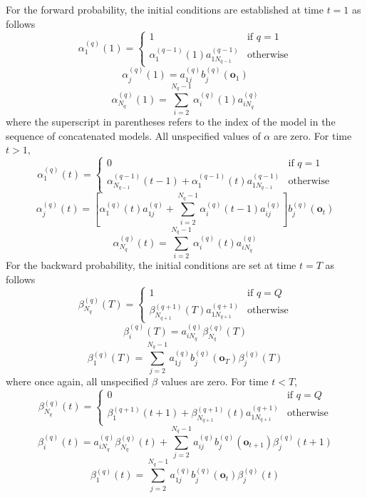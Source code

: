For the forward probability, the initial conditions are established at
time $t=1$ as follows
\[
   \alpha^{(q)}_{1}(1) = 
        \left\{ \begin{array}{cl}
                              1 & \mbox{if $q=1$} \\
                   \alpha^{(q-1)}_1(1)  a^{(q-1)}_{1N_{q-1}} & \mbox{otherwise}
                \end{array}
        \right.
\]
\[
   \alpha^{(q)}_{j}(1) = a^{(q)}_{1j} b^{(q)}_j(\bm{o}_1)
\]
\[
   \alpha^{(q)}_{N_q}(1) = 
        \sum_{i=2}^{N_q-1} \alpha^{(q)}_{i}(1) a^{(q)}_{iN_q}
\]
where the superscript in parentheses refers to the index of the model in 
the sequence of concatenated models.  All unspecified values of $\alpha$
are zero.  For time $t > 1$, 
\[
   \alpha^{(q)}_{1}(t) = 
        \left\{ \begin{array}{cl}
                              0 & \mbox{if $q=1$} \\
                   \alpha^{(q-1)}_{N_{q-1}}(t-1) + 
                   \alpha^{(q-1)}_1(t)  a^{(q-1)}_{1N_{q-1}}& \mbox{otherwise}
                \end{array}
        \right.
\]
\[
    \alpha^{(q)}_j(t) = 
          \left[ 
               \alpha^{(q)}_1(t) a^{(q)}_{1j} + 
                \sum_{i=2}^{N_q-1} \alpha^{(q)}_{i}(t-1) a^{(q)}_{ij}
          \right]
          b^{(q)}_j(\bm{o}_t)
\]
\[
   \alpha^{(q)}_{N_q}(t) = 
        \sum_{i=2}^{N_q-1} \alpha^{(q)}_{i}(t) a^{(q)}_{iN_q}
\]
For the backward probability, the initial conditions are set at time
$t=T$ as follows
\[
   \beta^{(q)}_{N_q}(T) = 
        \left\{ \begin{array}{cl}
                              1 & \mbox{if $q=Q$} \\
                   \beta^{(q+1)}_{N_{q+1}}(T) a^{(q+1)}_{1N_{q+1}} & \mbox{otherwise}
                \end{array}
        \right.
\]
\[
   \beta^{(q)}_i(T) = a^{(q)}_{iN_q} \beta^{(q)}_{N_q}(T)
\]
\[
   \beta^{(q)}_1(T) = \sum^{N_q - 1}_{j=2} 
                  a^{(q)}_{1j} b^{(q)}_j(\bm{o}_T) \beta^{(q)}_j(T)
\]
where once again, all unspecified $\beta$ values are zero.  For
time $t<T$,
\[
   \beta^{(q)}_{N_q}(t) = 
        \left\{ \begin{array}{cl}
                              0 & \mbox{if $q=Q$} \\
                   \beta^{(q+1)}_1(t+1)+ \beta^{(q+1)}_{N_{q+1}} (t) 
                               a^{(q+1)}_{1N_{q+1}} & \mbox{otherwise}
                \end{array}
        \right.
\]
\[
    \beta^{(q)}_i(t) = 
                a^{(q)}_{iN_q} \beta^{(q)}_{N_q}(t) +
               \sum_{j=2}^{N_q-1} a^{(q)}_{ij} 
                      b^{(q)}_j(\bm{o}_{t+1}) \beta^{(q)}_{j}(t+1) 
\]
\[
   \beta^{(q)}_{1}(t) = 
        \sum_{j=2}^{N_q-1} a^{(q)}_{1j} b^{(q)}_j(\bm{o}_t) 
                          \beta^{(q)}_{j}(t) 
\]




